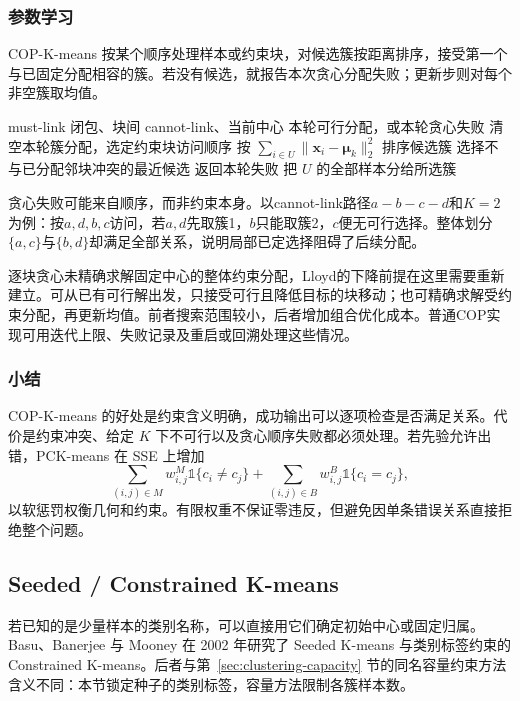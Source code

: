 \subsubsection{参数学习}

COP-K-means 按某个顺序处理样本或约束块，对候选簇按距离排序，接受第一个与已固定分配相容的簇。若没有候选，就报告本次贪心分配失败；更新步则对每个非空簇取均值。

\begin{algorithm}
 \label{alg:clustering-cop}
 \begin{algorithmic}[1]
 \Require must-link 闭包、块间 cannot-link、当前中心
 \Ensure 本轮可行分配，或本轮贪心失败
 \State 清空本轮簇分配，选定约束块访问顺序
  \State 按 $\sum_{i\in U}\lVert\bm{x}_i-\bm{\mu}_k\rVert_2^2$ 排序候选簇
  \State 选择不与已分配邻块冲突的最近候选
   \State 返回本轮失败
  \EndIf
  \State 把 $U$ 的全部样本分给所选簇
 \EndFor
 \end{algorithmic}
\end{algorithm}

贪心失败可能来自顺序，而非约束本身。以cannot-link路径$a-b-c-d$和$K=2$为例：按$a,d,b,c$访问，若$a,d$先取簇1，$b$只能取簇2，$c$便无可行选择。整体划分$\{a,c\}$与$\{b,d\}$却满足全部关系，说明局部已定选择阻碍了后续分配。

逐块贪心未精确求解固定中心的整体约束分配，Lloyd的下降前提在这里需要重新建立。可从已有可行解出发，只接受可行且降低目标的块移动；也可精确求解受约束分配，再更新均值。前者搜索范围较小，后者增加组合优化成本。普通COP实现可用迭代上限、失败记录及重启或回溯处理这些情况。

\subsubsection{小结}

COP-K-means 的好处是约束含义明确，成功输出可以逐项检查是否满足关系。代价是约束冲突、给定 $K$ 下不可行以及贪心顺序失败都必须处理。若先验允许出错，PCK-means 在 SSE 上增加
\[
 \sum_{(i,j)\in M}w_{i,j}^{M}\mathbb{1}\{c_i\ne c_j\}
 +\sum_{(i,j)\in B}w_{i,j}^{B}\mathbb{1}\{c_i=c_j\},
\]
以软惩罚权衡几何和约束。有限权重不保证零违反，但避免因单条错误关系直接拒绝整个问题。

\subsection{Seeded / Constrained K-means}
\label{sec:clustering-seeded}

若已知的是少量样本的类别名称，可以直接用它们确定初始中心或固定归属。Basu、Banerjee 与 Mooney 在 2002 年研究了 Seeded K-means 与类别标签约束的 Constrained K-means。后者与第~\ref{sec:clustering-capacity} 节的同名容量约束方法含义不同：本节锁定种子的类别标签，容量方法限制各簇样本数。

